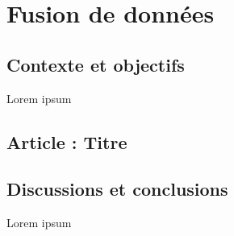 \chapter{Fusion de données}\label{chap:DF}

\section{Contexte et objectifs}

Lorem ipsum 

\section{Article : Titre} %

%

\section{Discussions et conclusions}

Lorem ipsum
